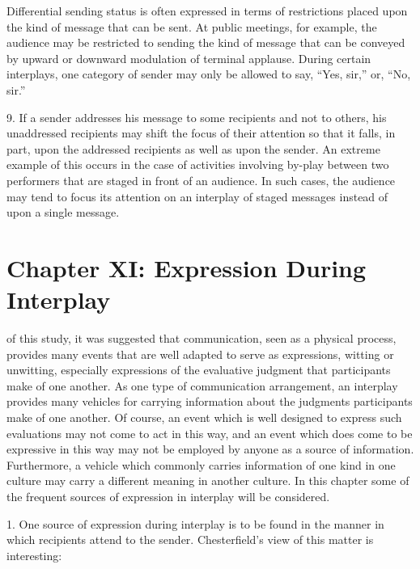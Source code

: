 \documentclass[openany,nobib]{tufte-book}
\let\oldchapter\chapter
\def\chapter{%
  \setcounter{footnote}{0}%
  \oldchapter
}
\begin{document}
Differential sending status is often expressed in terms of restrictions
placed upon the kind of message that can be sent. At public meetings,
for example, the audience may be restricted to sending the kind of
message that can be conveyed by upward or downward modulation of
terminal applause. During certain interplays, one category of sender may
only be allowed to say, ``Yes, sir,'' or, ``No, sir.''

9. If a sender addresses his message to some recipients and not to
others, his unaddressed recipients may shift the focus of their
attention so that it falls, in part, upon the addressed recipients as
well as upon the sender. An extreme example of this occurs in the case
of activities involving by-play between two performers that are staged
in front of an audience. In such cases, the audience may tend to focus
its attention on an interplay of staged messages instead of upon a
single message.

\chapter[CHAPTER XI: EXPRESSION DURING INTERPLAY]{Chapter XI: Expression During Interplay}
\label{ch:Chapter XI: Expression During Interplay}

of this study, it was suggested that communication,
seen as a physical process, provides many events that are well adapted
to serve as expressions, witting or unwitting, especially expressions of
the evaluative judgment that participants make of one another. As one
type of communication arrangement, an interplay provides many vehicles
for carrying information about the judgments participants make of one
another. Of course, an event which is well designed to express such
evaluations may not come to act in this way, and an event which does
come to be expressive in this way may not be employed by anyone as a
source of information. Furthermore, a vehicle which commonly carries
information of one kind in one culture may carry a different meaning in
another culture. In this chapter some of the frequent sources of
expression in interplay will be considered.

1. One source of expression during interplay is to be
found in the manner in which recipients attend to the sender.
Chesterfield's view of this matter is interesting:
\end{document}
